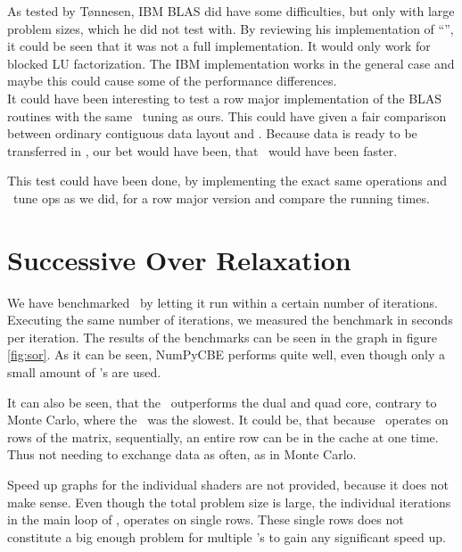 As tested by T{\o}nnesen, IBM BLAS did have some difficulties, but
only with large problem sizes, which he did not test with. By
reviewing his implementation of ``'', it could be seen
that it was not a full implementation. It would only work for blocked
LU factorization. The IBM implementation works in the general case and
maybe this could cause some of the performance differences.\\

It could have been interesting to test a row major implementation of
the BLAS routines with the same \CBE\ tuning as ours. This could have
given a fair comparison between ordinary contiguous data layout
and \FHB{}. Because data is ready to be transferred in \FHB{}, our bet
would have been, that \FHB\ would have been faster.

This test could have been done, by implementing the exact same
operations and \CBE\ tune ops as we did, for a row major version and
compare the running times.



\section{Successive Over Relaxation}


We have benchmarked \SOR\ by letting it run within a certain
number of iterations. Executing the same number of iterations, we
measured the benchmark in seconds per iteration. The results of the
benchmarks can be seen in the graph in figure \ref{fig:sor}. As it can
be seen, NumPyCBE performs quite well, even though only a small amount
of \SPE{}'s are used.


It can also be seen, that the \PPE\ outperforms the dual and quad
core, contrary to Monte Carlo, where the \PPE\ was the slowest. It
could be, that because \SOR\ operates on rows of the matrix,
sequentially, an entire row can be in the cache at one time. Thus not
needing to exchange data as often, as in Monte Carlo.

Speed up graphs for the individual shaders are not provided, because
it does not make sense. Even though the total problem size is large,
the individual iterations in the main loop of \SOR{}, operates on
single rows. These single rows does not constitute a big enough
problem for multiple \SPE{}'s to gain any significant speed up.

